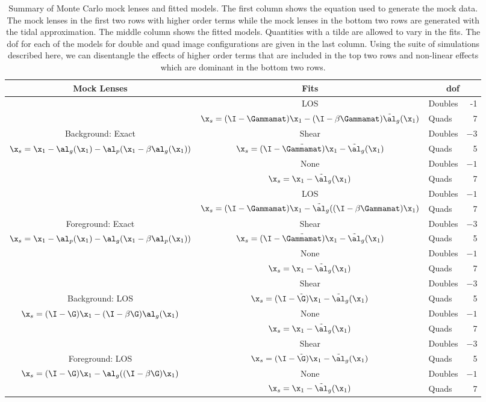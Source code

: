 \begin{table*}
\begin{tabular}{|c| c | l r |}
\hline
Mock Lenses & Fits & \multicolumn{2}{|c|}{dof} \\
\hline

& LOS & Doubles & -1 \\
&$\x_s = (\I-\Gammamat)\x_1 - (\I-\beta\Gammamat)\tilde{\al}_g(\x_1)$ & Quads &7 \\
 Background: Exact&Shear & Doubles & $-3$ \\
$\x_s = \x_1 - \al_g(\x_1) - \al_p(\x_1-\beta\al_g(\x_1))$&$\x_s = (\I-{\tilde\Gammamat})\x_1 - \tilde{\al}_g(\x_1)$&Quads& 5\\
&None&Doubles&$-1$\\
&$\x_s = \x_1 - \tilde{\al}_g(\x_1)$&Quads&7\\
\hline
&LOS & Doubles & $-1$ \\
&$\x_s = (\I-\Gammamat)\x_1 - \tilde{\al}_g((\I-\beta\Gammamat)\x_1)$ & Quads &7 \\
Foreground: Exact & Shear & Doubles & $-3$ \\
$\x_s = \x_1 - \al_p(\x_1) - \al_g(\x_1-\beta\al_p(\x_1))$&$\x_s = (\I-{\tilde\Gammamat})\x_1 - \tilde{\al}_g(\x_1)$&Quads& 5\\
&None&Doubles&$-1$\\
&$\x_s = \x_1 - \tilde{\al}_g(\x_1)$&Quads&7\\
\hline

&Shear & Doubles & $-3$ \\
Background: LOS&$\x_s = (\I-{\tilde\G})\x_1 - \tilde{\al}_g(\x_1)$&Quads& 5\\
 $\x_s = (\I-\G)\x_1 - (\I-\beta\G)\al_g(\x_1)$ &None&Doubles&$-1$\\
&$\x_s = \x_1 - \tilde{\al}_g(\x_1)$&Quads&7\\
\hline
& Shear & Doubles & $-3$ \\
Foreground: LOS&$\x_s = (\I-{\tilde\G})\x_1 - \tilde{\al}_g(\x_1)$&Quads& 5\\
$\x_s = (\I-\G)\x_1 - \al_g((\I-\beta\G)\x_1)$&None&Doubles&$-1$\\
&$\x_s = \x_1 - \tilde{\al}_g(\x_1)$&Quads&7\\
\hline
\end{tabular}
\caption[Summary of Monte Carlo mock lenses and fitted models]{Summary of Monte Carlo mock lenses and fitted models. The first column shows the equation used to generate the mock data. The mock lenses in the first two rows with higher order terms while the mock lenses in the bottom two rows are generated with the tidal approximation. The middle column shows the fitted models. Quantities with a tilde are allowed to vary in the fits. The dof for each of the models for double and quad image configurations are given in the last column. Using the suite of simulations described here, we can disentangle the effects of higher order terms that are included in the top two rows and non-linear effects which are dominant in the bottom two rows. }
\label{tab:models}
\end{table*}